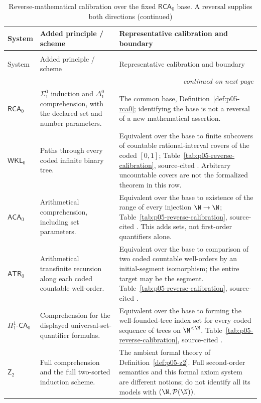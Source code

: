 \begingroup\small
\begin{longtable}{@{}p{}p{}p{}@{}}
\caption{Reverse-mathematical calibration over the fixed
\(\mathsf{RCA}_0\) base. A reversal supplies both directions.}
\label{tab:p14-strength-reverse-mathematics}\\
\toprule
System & Added principle / scheme & Representative calibration and boundary \\
\midrule
\endfirsthead
\caption[]{Reverse-mathematical calibration over the fixed
\(\mathsf{RCA}_0\) base. A reversal supplies both directions (continued)}\\
\toprule
System & Added principle / scheme & Representative calibration and boundary \\
\midrule
\endhead
\midrule\multicolumn{3}{r}{\emph{continued on next page}}\\
\endfoot
\endlastfoot
\(\mathsf{RCA}_0\) & \(\Sigma^0_1\) induction and
\(\Delta^0_1\) comprehension, with the declared set and number parameters. &
The common base, Definition~\ref{def:p05-rca0}; identifying the base is not
a reversal of a new mathematical assertion. \\
\addlinespace
\(\mathsf{WKL}_0\) & Paths through every coded infinite binary tree. &
Equivalent over the base to finite subcovers of countable rational-interval
covers of the coded \([0,1]\); Table~\ref{tab:p05-reverse-calibration},
source-cited \cite{Simpson2009}. Arbitrary uncountable covers are not the
formalized theorem in this row. \\
\addlinespace
\(\mathsf{ACA}_0\) & Arithmetical comprehension, including set parameters. &
Equivalent over the base to existence of the range of every injection
\(\N\to\N\); Table~\ref{tab:p05-reverse-calibration}, source-cited
\cite{Simpson2009}. This adds sets, not first-order quantifiers alone. \\
\addlinespace
\(\mathsf{ATR}_0\) & Arithmetical transfinite recursion along each coded
countable well-order. &
Equivalent over the base to comparison of two coded countable well-orders
by an initial-segment isomorphism; the entire target may be the segment.
Table~\ref{tab:p05-reverse-calibration}, source-cited \cite{Simpson2009}. \\
\addlinespace
\(\Pi^1_1\text{-}\mathsf{CA}_0\) & Comprehension for the displayed
universal-set-quantifier formulas. &
Equivalent over the base to forming the well-founded-tree index set for
every coded sequence of trees on \(\N^{<\N}\).
Table~\ref{tab:p05-reverse-calibration}, source-cited \cite{Simpson2009}. \\
\addlinespace
\(\mathsf Z_2\) & Full comprehension and the full two-sorted induction
scheme. &
The ambient formal theory of Definition~\ref{def:p05-z2}. Full second-order
semantics and this formal axiom system are different notions; do not
identify all its models with \((\N,\mathcal P(\N))\). \\
\bottomrule
\end{longtable}
\endgroup

